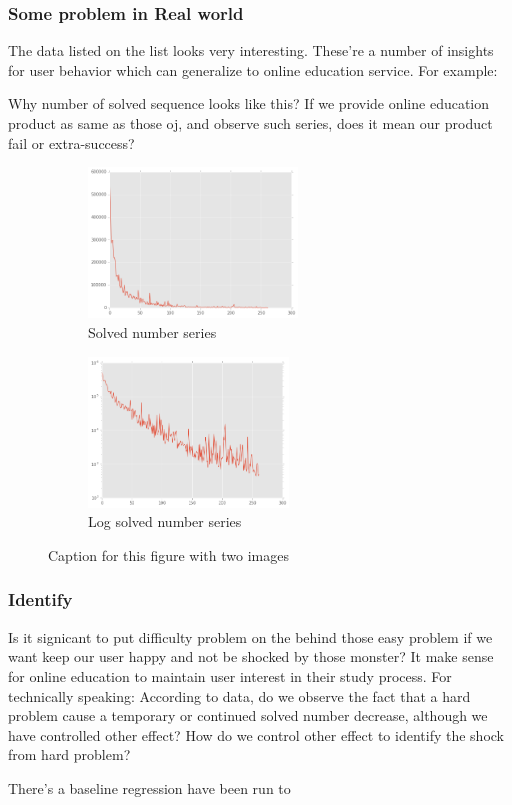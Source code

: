 \documentclass{beamer}
\begin{document}
\begin{frame}
\frametitle{Some problem in Real world}

The data listed on the list looks very interesting. These're a number of insights for user behavior which 
can generalize to online education service. For example:

Why number of solved sequence looks like this? If we provide online education product as same as those oj, 
and observe such series, does it mean our product fail or extra-success?

\begin{figure}[h]
 
\begin{subfigure}{0.45\textwidth}
\includegraphics[width=0.9\linewidth, height=4cm]{solved-seq1.png} 
\caption{Solved number series}
\label{fig:subim1}
\end{subfigure}
\begin{subfigure}{0.45\textwidth}
\includegraphics[width=0.9\linewidth, height=4cm]{solved-seq2.png}
\caption{Log solved number series}
\label{fig:subim2}
\end{subfigure}
 
\caption{Caption for this figure with two images}
\label{fig:image2}
\end{figure}

\end{frame}

\begin{frame}

\frametitle{Identify}

Is it signicant to put difficulty problem on the behind those easy problem 
if we want keep our user happy and not be shocked by those monster? It make sense
for online education to maintain user interest in their study process. For technically speaking:
According to data, do we observe the fact that a hard problem cause a temporary 
or continued solved number decrease,
although we have controlled other effect? 
How do we control other effect to identify the shock from hard problem?

There's a baseline regression have been run to 

\end{frame}
\end{document}
